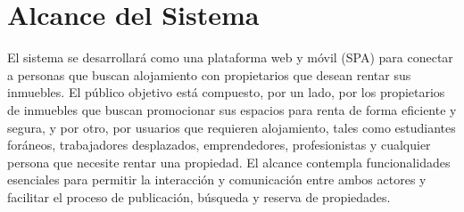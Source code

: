 \section{Alcance del Sistema}
	\noindent El sistema se desarrollará como una plataforma web y móvil (SPA) para conectar a personas que buscan alojamiento con propietarios que desean rentar sus inmuebles. El público objetivo está compuesto, por un lado, por los propietarios de inmuebles que buscan promocionar sus espacios para renta de forma eficiente y segura, y por otro, por usuarios que requieren alojamiento, tales como estudiantes foráneos, trabajadores desplazados, emprendedores, profesionistas y cualquier persona que necesite rentar una propiedad. El alcance contempla funcionalidades esenciales para permitir la interacción y comunicación entre ambos actores y facilitar el proceso de publicación, búsqueda y reserva de propiedades.